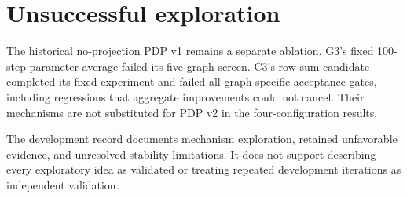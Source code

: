 \section{Unsuccessful exploration}
The historical no-projection PDP v1 remains a separate ablation. G3's fixed 100-step parameter average failed its five-graph screen. C3's row-sum candidate completed its fixed experiment and failed all graph-specific acceptance gates, including regressions that aggregate improvements could not cancel. Their mechanisms are not substituted for PDP v2 in the four-configuration results.

The development record documents mechanism exploration, retained unfavorable evidence, and unresolved stability limitations. It does not support describing every exploratory idea as validated or treating repeated development iterations as independent validation.
